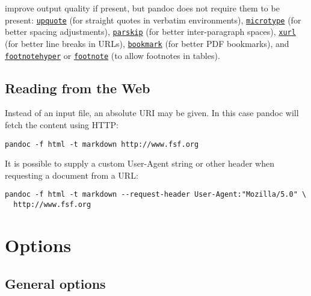 \documentclass[
  12pt,
  a4paper,
]{article}
\begin{document}
improve output quality if present, but pandoc does not require them to be present:
\href{https://ctan.org/pkg/upquote}{\texttt{upquote}} (for straight quotes in verbatim
environments), \href{https://ctan.org/pkg/microtype}{\texttt{microtype}} (for better spacing
adjustments), \href{https://ctan.org/pkg/parskip}{\texttt{parskip}} (for better inter-paragraph
spaces), \href{https://ctan.org/pkg/xurl}{\texttt{xurl}} (for better line breaks in URLs),
\href{https://ctan.org/pkg/bookmark}{\texttt{bookmark}} (for better PDF bookmarks), and
\href{https://ctan.org/pkg/footnotehyper}{\texttt{footnotehyper}} or
\href{https://ctan.org/pkg/footnote}{\texttt{footnote}} (to allow footnotes in tables).

\hypertarget{reading-from-the-web}{%
\subsection{Reading from the Web}\label{reading-from-the-web}}

Instead of an input file, an absolute URI may be given. In this case pandoc will fetch the content
using HTTP:

\begin{verbatim}
pandoc -f html -t markdown http://www.fsf.org
\end{verbatim}

It is possible to supply a custom User-Agent string or other header when requesting a document
from a URL:

\begin{verbatim}
pandoc -f html -t markdown --request-header User-Agent:"Mozilla/5.0" \
  http://www.fsf.org
\end{verbatim}

\hypertarget{options}{%
\section{Options}\label{options}}

\hypertarget{general-options}{%
\subsection{General options}\label{general-options}}
\end{document}
